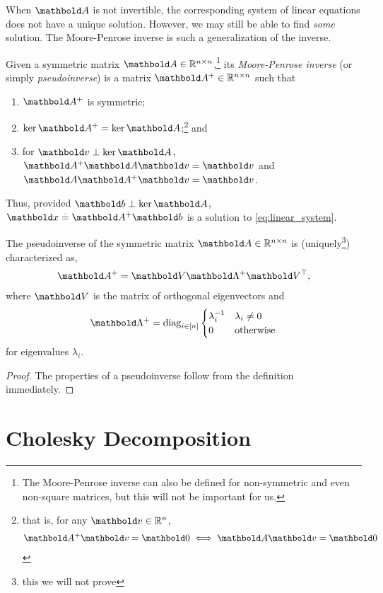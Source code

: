 When $\mA$ is not invertible, the corresponding system of linear equations does not have a unique solution. However, we may still be able to find \emph{some} solution. The Moore-Penrose inverse is such a generalization of the inverse.

\begin{defn} Given a symmetric matrix $\mA \in \R^{n \times n}$,\footnote{The Moore-Penrose inverse can also be defined for non-symmetric and even non-square matrices, but this will not be important for us.} its \emph{Moore-Penrose inverse} (or simply \emph{pseudoinverse}) is a matrix $\pinv{\mA} \in \R^{n \times n}$ such that \begin{enumerate}
    \item $\pinv{\mA}$ is symmetric;
    \item $\ker{\pinv{\mA}} = \ker{\mA}$;\footnote{that is, for any $\vv \in \R^n$, \begin{align*}
        \pinv{\mA}\vv = \vZero \iff \mA\vv = \vZero
    \end{align*}} and
    \item for $\vv \perp \ker{\mA}$, $\pinv{\mA}\mA\vv = \vv$ and $\mA\pinv{\mA}\vv = \vv$.
\end{enumerate}
\end{defn}

Thus, provided $\vb \perp \ker\mA$, $\vx \defeq \pinv{\mA}\vb$ is a solution to \cref{eq:linear_system}.

\begin{lem}
The pseudoinverse of the symmetric matrix $\mA \in \R^{n \times n}$ is (uniquely\footnote{this we will not prove}) characterized as, \begin{align}
    \pinv{\mA} = \mV\pinv{\mLambda}\trans{\mV},
\end{align} where $\mV$ is the matrix of orthogonal eigenvectors and \begin{align}
    \pinv{\mLambda} = \diag_{i\in[n]}\begin{cases}
    \inv{\lambda_i} & \lambda_i \neq 0 \\
    0 & \text{otherwise}
    \end{cases}
\end{align} for eigenvalues $\lambda_i$.
\end{lem}
\begin{proof}
The properties of a pseudoinverse follow from the definition immediately.
\end{proof}

\section{Cholesky Decomposition}